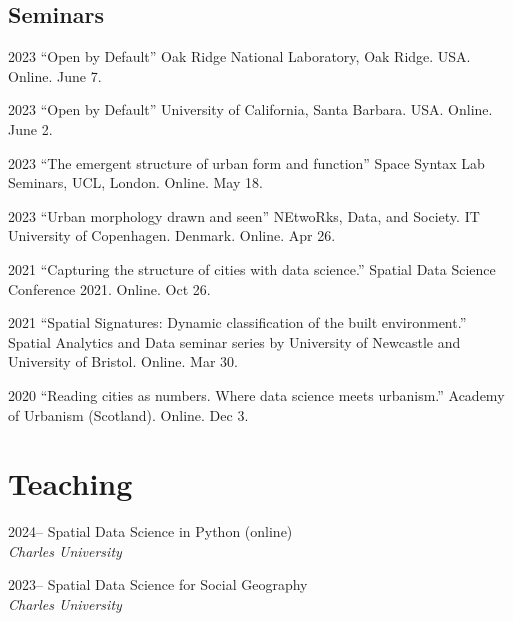 \documentclass[12pt,a4paper]{report}
\begin{document}
    \subsection*{Seminars}

    \begin{tablist}

        \item[2023] \tab{}\enquote{Open by Default} Oak Ridge National Laboratory, Oak Ridge. USA. Online. June 7.
        \item[2023] \tab{}\enquote{Open by Default} University of California, Santa Barbara. USA. Online. June 2.
        \item[2023] \tab{}\enquote{The emergent structure of urban form and function} Space Syntax Lab Seminars, UCL, London. Online. May 18.
        \item[2023] \tab{}\enquote{Urban morphology drawn and seen} NEtwoRks, Data, and Society. IT University of Copenhagen. Denmark. Online. Apr 26.
        \item[2021] \tab{}\enquote{Capturing the structure of cities with data science.} Spatial Data Science Conference 2021. Online. Oct 26.
        \item[2021] \tab{}\enquote{Spatial Signatures: Dynamic classification of the built environment.} Spatial Analytics and Data seminar series by University of Newcastle and University of Bristol. Online. Mar 30.
        \item[2020] \tab{}\enquote{Reading cities as numbers. Where data science meets urbanism.} Academy of Urbanism (Scotland). Online. Dec 3.

    \end{tablist}

    \section*{Teaching}

    \begin{tablist}

        \item[2024--] \tab{}Spatial Data Science in Python (online) \\
                            \textit{Charles University}
        \item[2023--] \tab{}Spatial Data Science for Social Geography \\
                            \textit{Charles University}

    \end{tablist}
\end{document}
